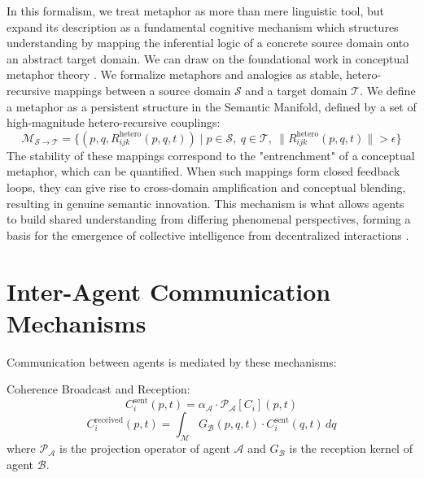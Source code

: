 In this formalism, we treat metaphor as more than mere linguistic tool, but expand its description as a fundamental cognitive mechanism which structures understanding by mapping the inferential logic of a concrete source domain onto an abstract target domain. We can draw on the foundational work in conceptual metaphor theory \autocite{LakoffJohnson1980, HofstadterSander2013}. We formalize metaphors and analogies as stable, hetero-recursive mappings between a source domain \(\mathcal{S}\) and a target domain \(\mathcal{T}\). We define a metaphor as a persistent structure in the Semantic Manifold, defined by a set of high-magnitude hetero-recursive couplings:
\begin{equation}
\mathcal{M}_{\mathcal{S} \to \mathcal{T}} = \{(p, q, R_{ijk}^{\text{hetero}}(p, q, t)) \mid p \in \mathcal{S},\ q \in \mathcal{T},\ \|R_{ijk}^{\text{hetero}}(p, q, t)\| > \epsilon\}
\end{equation}
The stability of these mappings correspond to the "entrenchment" of a conceptual metaphor, which can be quantified. When such mappings form closed feedback loops, they can give rise to cross-domain amplification and conceptual blending, resulting in genuine semantic innovation. This mechanism is what allows agents to build shared understanding from differing phenomenal perspectives, forming a basis for the emergence of collective intelligence from decentralized interactions \autocite{Surowiecki2004}.


\section{Inter-Agent Communication Mechanisms}

Communication between agents is mediated by these mechanisms:

Coherence Broadcast and Reception:
\begin{equation}
C_i^{\mathrm{sent}}(p,t) = \alpha_{\mathcal{A}} \cdot \mathcal{P}_{\mathcal{A}}[C_i](p,t)
\end{equation}
\begin{equation}
C_i^{\mathrm{received}}(p,t) = \int_{\mathcal{M}} G_{\mathcal{B}}(p,q,t) \cdot C_i^{\mathrm{sent}}(q,t) \, dq
\end{equation}
where \(\mathcal{P}_{\mathcal{A}}\) is the projection operator of agent \(\mathcal{A}\) and \(G_{\mathcal{B}}\) is the reception kernel of agent \(\mathcal{B}\).

